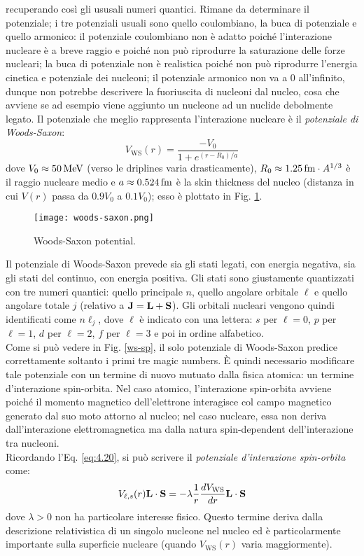 recuperando così gli ususali numeri quantici. Rimane da determinare il potenziale; i tre potenziali usuali sono quello coulombiano, la buca di potenziale e quello armonico: il potenziale coulombiano non è adatto poiché l'interazione nucleare è a breve raggio e poiché non può riprodurre la saturazione delle forze nucleari; la buca di potenziale non è realistica poiché non può riprodurre l'energia cinetica e potenziale dei nucleoni; il potenziale armonico non va a 0 all'infinito, dunque non potrebbe descrivere la fuoriuscita di nucleoni dal nucleo, cosa che avviene se ad esempio viene aggiunto un nucleone ad un nuclide debolmente legato. Il potenziale che meglio rappresenta l'interazione nucleare è il \textit{potenziale di Woods-Saxon}:
\begin{equation}
	V_{\text{WS}}(r) = \frac{-V_0}{1 + e^{(r - R_0) / a}}
	\label{eq:5.4}
\end{equation}
dove $ V_0 \approx 50\,\mathrm{MeV} $ (verso le driplines varia drasticamente), $ R_0 \approx 1.25\,\mathrm{fm} \cdot A^{1/3} $ è il raggio nucleare medio e $ a \approx 0.524\,\mathrm{fm} $ è la skin thickness del nucleo (distanza in cui $ V(r) $ passa da $ 0.9 V_0 $ a $ 0.1 V_0 $); esso è plottato in Fig. \ref{woods-saxon}.

\begin{figure}[!b]
	\centering
	\texttt{[image: woods-saxon.png]}
	\caption{Woods-Saxon potential.}
	\label{woods-saxon}
\end{figure}

Il potenziale di Woods-Saxon prevede sia gli stati legati, con energia negativa, sia gli stati del continuo, con energia positiva. Gli stati sono giustamente quantizzati con tre numeri quantici: quello principale $ n $, quello angolare orbitale $ \ell $ e quello angolare totale $ j $ (relativo a $ \mathbf{J} = \mathbf{L} + \mathbf{S} $). Gli orbitali nucleari vengono quindi identificati come $ n\ell_j $, dove $ \ell $ è indicato con una lettera: $ s $ per $ \ell = 0 $, $ p $ per $ \ell = 1 $, $ d $ per $ \ell = 2 $, $ f $ per $ \ell = 3 $ e poi in ordine alfabetico.\\
Come si può vedere in Fig. \ref{ws-sp}, il solo potenziale di Woods-Saxon predice correttamente soltanto i primi tre magic numbers. È quindi necessario modificare tale potenziale con un termine di nuovo mutuato dalla fisica atomica: un termine d'interazione spin-orbita. Nel caso atomico, l'interazione spin-orbita avviene poiché il momento magnetico dell'elettrone interagisce col campo magnetico generato dal suo moto attorno al nucleo; nel caso nucleare, essa non deriva dall'interazione elettromagnetica ma dalla natura spin-dependent dell'interazione tra nucleoni.\\
Ricordando l'Eq. \ref{eq:4.20}, si può scrivere il \textit{potenziale d'interazione spin-orbita} come:
\begin{equation}
	V_{\ell,s}(r) \mathbf{L}\cdot\mathbf{S} = - \lambda \frac{1}{r} \frac{dV_{\text{WS}}}{dr} \mathbf{L}\cdot\mathbf{S}
	\label{eq:5.5}
\end{equation}
dove $ \lambda > 0 $ non ha particolare interesse fisico. Questo termine deriva dalla descrizione relativistica di un singolo nucleone nel nucleo ed è particolarmente importante sulla superficie nucleare (quando $ V_{\text{WS}}(r) $ varia maggiormente).


